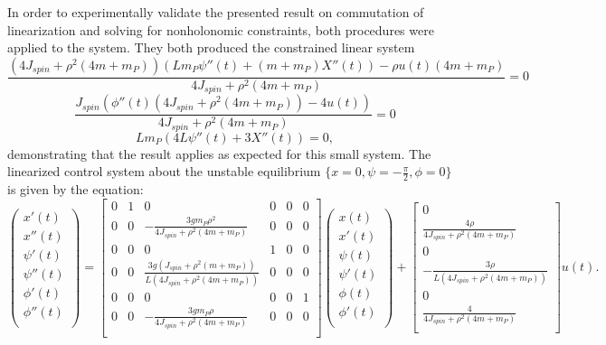 In order to experimentally validate the presented result on commutation of linearization and solving for nonholonomic constraints, both procedures were applied to the system. 
They both produced the constrained linear system
\begin{equation}
	\frac{\left(4 J_{spin}+\rho ^2 (4 m+m_{P})\right)
   \left(L m_{P} \psi ''(t)+(m+m_{P}) X''(t)\right)-\rho 
   u(t) (4 m+m_{P})}{4 J_{spin}+\rho ^2 (4
   m+m_{P})}=0
\end{equation}
\begin{equation}
	\frac{J_{spin} \left(\phi ''(t) \left(4
   J_{spin}+\rho ^2 (4 m+m_{P})\right)-4 u(t)\right)}{4
   J_{spin}+\rho ^2 (4 m+m_{P})}=0
\end{equation}
\begin{equation}
	L m_{P} \left(4 L
   \psi ''(t)+3 X''(t)\right)=0,
\end{equation}
demonstrating that the result applies as expected for this small system. 
The linearized control system about the unstable equilibrium $\{x=0,\psi=-\frac{\pi}{2},\phi=0\}$ is given by the equation:
\begin{equation}
\left(
\begin{array}{c}
 x'(t) \\
 x''(t) \\
 \psi'(t) \\
 \psi''(t) \\
 \phi'(t) \\
 \phi''(t) \\
\end{array}
\right)
=
\left[
\begin{array}{cccccc}
 0 & 1 & 0 & 0 & 0 & 0 \\
 0 & 0 & -\frac{3 g m_{P} \rho ^2}{4 J_{spin}+\rho ^2 (4
   m+m_{P})} & 0 & 0 & 0 \\
 0 & 0 & 0 & 1 & 0 & 0 \\
 0 & 0 & \frac{3 g \left(J_{spin}+\rho ^2
   (m+m_{P})\right)}{L \left(4 J_{spin}+\rho ^2 (4
   m+m_{P})\right)} & 0 & 0 & 0 \\
 0 & 0 & 0 & 0 & 0 & 1 \\
 0 & 0 & -\frac{3 g m_{P} \rho }{4 J_{spin}+\rho ^2 (4
   m+m_{P})} & 0 & 0 & 0 \\
\end{array}
\right]
\left(
\begin{array}{c}
 x(t) \\
 x'(t) \\
 \psi(t) \\
 \psi'(t) \\
 \phi(t) \\
 \phi'(t) \\
\end{array}
\right)
+
\left[
\begin{array}{c}
 0 \\
 \frac{4 \rho }{4 J_{spin}+\rho ^2 (4 m+m_{P})} \\
 0 \\
 -\frac{3 \rho }{L \left(4 J_{spin}+\rho ^2 (4
   m+m_{P})\right)} \\
 0 \\
 \frac{4}{4 J_{spin}+\rho ^2 (4 m+m_{P})} \\
\end{array}
\right]u(t).
\end{equation}
